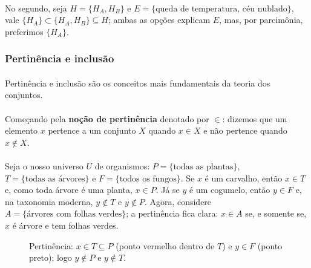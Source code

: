\documentclass[12pt,a4paper]{article}
\begin{document}
\paragraph{}
No segundo, seja \(H=\{H_A, H_B\}\) e \(E=\{\text{queda de temperatura},\, \text{céu nublado}\}\), vale \(\{H_A\} \subset \{H_A,H_B\} \subseteq H\); ambas as opções explicam \(E\), mas, 
por parcimônia, preferimos \(\{H_A\}\).

\subsubsection{Pertinência e inclusão}
\paragraph{}

Pertinência e inclusão são os conceitos mais fundamentais da teoria dos conjuntos. 

\paragraph{}
Começando pela \textbf{noção de pertinência} denotado por \(\in\): dizemos que um elemento \(x\) pertence a um conjunto \(X\) quando \(x \in X\) e não pertence quando \(x \notin X\).

\paragraph{}
Seja o nosso universo \(U\) de organismos: \(P=\{\text{todas as plantas}\}\), \(T=\{\text{todas as árvores}\}\) e \(F=\{\text{todos os fungos}\}\). Se \(x\) é um carvalho, então \(x\in T\) e, como toda árvore é uma planta, \(x\in P\). Já se \(y\) é um cogumelo, então \(y\in F\) e, na taxonomia moderna, \(y\notin T\) e \(y\notin P\). Agora, considere \(A=\{\text{árvores com folhas verdes}\}\); a pertinência fica clara: \(x\in A\) se, e somente se, \(x\) é árvore e tem folhas verdes.

\begin{figure}[H]
    \centering
    \caption{Pertinência: $x\in T\subseteq P$ (ponto vermelho dentro de $T$) e $y\in F$ (ponto preto); logo $y\notin P$ e $y\notin T$.}
    \label{fig:pertinencia}
\end{figure}
\end{document}
